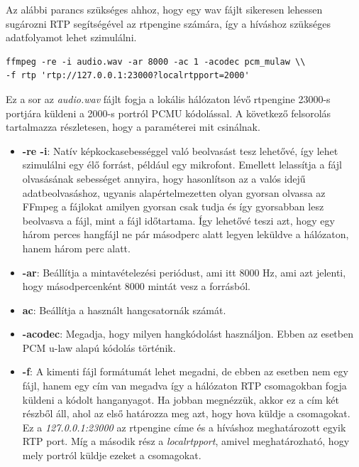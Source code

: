 Az alábbi parancs szükséges ahhoz, hogy egy wav fájlt sikeresen lehessen sugározni
RTP segítségével az rtpengine számára, így a híváshoz szükséges adatfolyamot lehet
szimulálni. 

\begin{lstlisting}[caption=FFmpeg RTP folyam indtása, label=lst:FFmpeg]
ffmpeg -re -i audio.wav -ar 8000 -ac 1 -acodec pcm_mulaw \\
-f rtp 'rtp://127.0.0.1:23000?localrtpport=2000'
\end{lstlisting}

Ez a sor az \textit{audio.wav} fájlt fogja a lokális hálózaton lévő rtpengine 23000-s
portjára küldeni a 2000-s portról PCMU kódolással. A következő felsorolás 
tartalmazza részletesen, hogy a paraméterei mit csinálnak.

\begin{itemize}
	\item \textbf{-re -i}: Natív képkockasebességgel való beolvasást tesz lehetővé, 
	így lehet szimulálni egy élő forrást, például egy mikrofont. Emellett lelassítja
	a fájl olvasásának sebességet annyira, hogy hasonlítson az a valós idejű
	adatbeolvasáshoz, ugyanis alapértelmezetten olyan gyorsan olvassa az FFmpeg a
	fájlokat amilyen gyorsan csak tudja és így gyorsabban lesz beolvasva a fájl,
	mint a fájl időtartama. 
	Így lehetővé teszi azt, hogy egy három perces hangfájl ne pár másodperc alatt 
	legyen leküldve a hálózaton, hanem három perc alatt. 
	\item \textbf{-ar}: Beállítja a mintavételezési periódust, ami itt 8000 Hz, ami 
	azt jelenti, hogy másodpercenként 8000 mintát vesz a forrásból. 
	\item \textbf{ac}: Beállítja a használt hangcsatornák számát.
	\item \textbf{-acodec}: Megadja, hogy milyen hangkódolást használjon. Ebben az 
	esetben PCM u-law alapú kódolás történik.
	\item \textbf{-f}: A kimenti fájl formátumát lehet megadni, de ebben az esetben
	nem egy fájl, hanem egy cím van megadva így a hálózaton RTP csomagokban fogja 
	küldeni a kódolt hanganyagot. Ha jobban megnézzük, akkor ez a cím két részből áll,
	ahol az első határozza meg azt, hogy hova küldje a csomagokat. Ez a 
	\textit{127.0.0.1:23000} az rtpengine címe és a híváshoz meghatározott egyik RTP
	port. Míg a második rész a \textit{localrtpport}, amivel meghatározható, hogy
	mely portról küldje ezeket a csomagokat.
\end{itemize}

